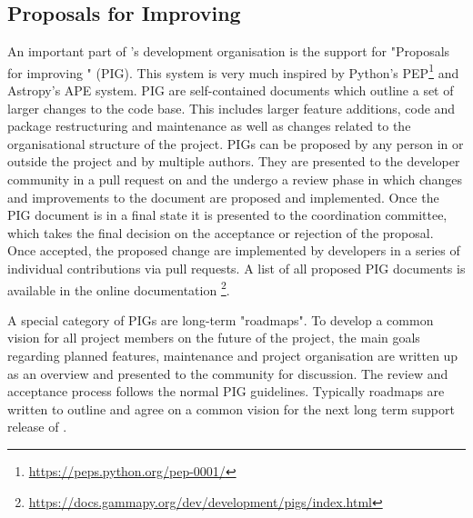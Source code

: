 \documentclass[traditabstract, longauth]{aa}
\begin{document}
\subsection{Proposals for Improving \gammapy}
\label{ssec:pigs}
An important part of \gammapy's development organisation is the support
for "Proposals for improving \gammapy" (PIG). This system is very much
inspired by Python's PEP\footnote{\url{https://peps.python.org/pep-0001/}}
and Astropy's APE \citep{greenfield_perry_2013} system.
PIG are self-contained documents which outline a set of larger
changes to the \gammapy code base. This includes larger feature additions,
code and package restructuring and maintenance as well as changes related
to the organisational structure of the \gammapy project. PIGs can be proposed
by any person in or outside the project and by multiple authors. They
are presented to the \gammapy developer community in a pull request
on \github and the undergo a review phase in which changes and
improvements to the document are proposed and implemented. Once the PIG
document is in a final state it is presented to the \gammapy
coordination committee, which takes the final decision on the
acceptance or rejection of the proposal. Once accepted, the proposed
change are implemented by \gammapy developers in a series of
individual contributions via pull requests. A list of all proposed
PIG documents is available in the \gammapy online documentation
\footnote{\url{https://docs.gammapy.org/dev/development/pigs/index.html}}.

A special category of PIGs are long-term "roadmaps". To develop a common
vision for all \gammapy project members on the future of the
project, the main goals regarding planned features, maintenance and
project organisation are written up as an overview and presented to the
\gammapy community for discussion. The review and acceptance process
follows the normal PIG guidelines. Typically roadmaps are written
to outline and agree on a common vision for the next long term
support release of \gammapy.
\end{document}
